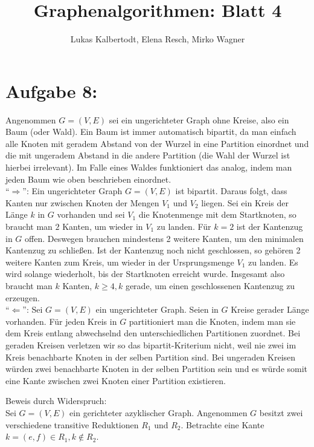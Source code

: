 \documentclass[11pt]{scrartcl} %
\title{Graphenalgorithmen: Blatt 4}
\author{Lukas Kalbertodt, Elena Resch, Mirko Wagner}
\begin{document}
\maketitle
\section*{Aufgabe 8:}
\begin{compactenum}[(a)]
\item Angenommen $G = (V, E)$ sei ein ungerichteter Graph ohne Kreise, also ein Baum (oder Wald). Ein Baum ist immer automatisch bipartit, da man einfach alle Knoten mit geradem Abstand von der Wurzel in eine Partition einordnet und die mit ungeradem Abstand in die andere Partition (die Wahl der Wurzel ist hierbei irrelevant). Im Falle eines Waldes funktioniert das analog, indem man jeden Baum wie oben beschrieben einordnet.\\
\enquote{$\Rightarrow$}: Ein ungerichteter Graph $G =(V,E)$ ist bipartit. Daraus folgt, dass Kanten nur zwischen Knoten der Mengen $V_1$ und $V_2$ liegen. Sei ein Kreis der Länge $k$ in $G$ vorhanden und sei $V_1$ die Knotenmenge mit dem Startknoten, so braucht man $2$ Kanten, um wieder in $V_1$ zu landen. Für $k=2$ ist der Kantenzug in $G$ offen. Deswegen brauchen mindestens 2 weitere Kanten, um den minimalen Kantenzug zu schließen. Ist der Kantenzug noch nicht geschlossen, so gehören 2 weitere Kanten zum Kreis, um wieder in der Ursprungsmenge $V_1$ zu landen. Es wird solange wiederholt, bis der Startknoten erreicht wurde.
Insgesamt also braucht man $k$ Kanten, $k \geq 4, k$ gerade, um einen geschlossenen Kantenzug zu erzeugen.\\
\enquote{$\Leftarrow$}: Sei $G=(V,E)$ ein ungerichteter Graph. Seien in $G$ Kreise gerader Länge vorhanden. Für jeden Kreis in $G$ partitioniert man die Knoten, indem man sie dem Kreis entlang abwechselnd den unterschiedlichen Partitionen zuordnet. Bei geraden Kreisen verletzen wir so das bipartit-Kriterium nicht, weil nie zwei im Kreis benachbarte Knoten in der selben Partition sind. Bei ungeraden Kreisen würden zwei benachbarte Knoten in der selben Partition sein und es würde somit eine Kante zwischen zwei Knoten einer Partition existieren.\\
\item Beweis durch Widerspruch:\\
Sei $G=(V,E)$ ein gerichteter azyklischer Graph. Angenommen $G$ besitzt zwei verschiedene transitive Reduktionen $R_1$ und $R_2$. Betrachte eine Kante $k=(e,f) \in R_1, k \notin R_2$. \\

\end{compactenum}
\end{document}
